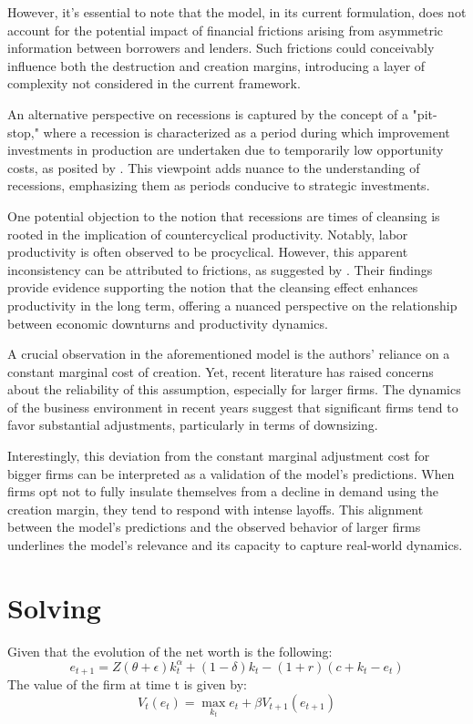 \documentclass[12pt]{article}
\begin{document}
However, it's essential to note that the model, in its current formulation, does not account for the potential impact of
financial frictions arising from asymmetric information between borrowers and lenders. Such frictions could conceivably
influence both the destruction and creation margins, introducing a layer of complexity not considered in the current
framework. 

An alternative perspective on recessions is captured by the concept of a "pit-stop," where a recession is characterized
as a period during which improvement investments in production are undertaken due to temporarily low opportunity costs,
as posited by \cite{DAvHalt90}. This viewpoint adds nuance to the understanding of recessions, emphasizing them as
periods conducive to strategic investments. 

One potential objection to the notion that recessions are times of cleansing is rooted in the implication of
countercyclical productivity. Notably, labor productivity is often observed to be procyclical. However, this apparent
inconsistency can be attributed to frictions, as suggested by \cite{GaHam92}. Their findings provide evidence supporting
the notion that the cleansing effect enhances productivity in the long term, offering a nuanced perspective on the
relationship between economic downturns and productivity dynamics. 
\par
A crucial observation in the aforementioned model is the authors' reliance on a constant marginal cost of creation. Yet,
recent literature has raised concerns about the reliability of this assumption, especially for larger firms. The
dynamics of the business environment in recent years suggest that significant firms tend to favor substantial
adjustments, particularly in terms of downsizing. 
\par
Interestingly, this deviation from the constant marginal adjustment cost for bigger firms can be interpreted as a
validation of the model's predictions. When firms opt not to fully insulate themselves from a decline in demand using
the creation margin, they tend to respond with intense layoffs. This alignment between the model's predictions and the
observed behavior of larger firms underlines the model's relevance and its capacity to capture real-world dynamics. 

\section{Solving}

Given that the evolution of the net worth is the following:
\[e_{t+1} = Z(\theta +\epsilon)k_t^\alpha + (1-\delta )k_t - (1+r)(c+k_t-e_t)\]
The value of the firm at time t is given by:
\[V_t(e_t) =\max_{k_t}  e_t + \beta V_{t+1}(e_{t+1})\]
\end{document}
